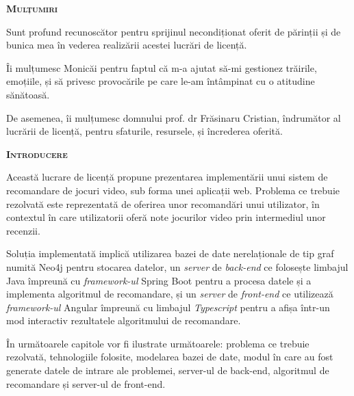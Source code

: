 \documentclass[12pt,a4paper]{report}
\begin{document}
\hfill \break
	\begin{center}
	{\scshape\large \textbf{Mulțumiri} \par}
	\end{center}
	
\begin{flushright}
\hfill \break
\hfill \break
Sunt profund recunoscător pentru sprijinul necondiționat oferit de părinții și de bunica mea în vederea realizării acestei lucrări de licență.
\end{flushright}
\hfill \break
\hfill \break
\hfill \break
\begin{flushright}
Îi mulțumesc Monicăi pentru faptul că m-a ajutat să-mi gestionez trăirile, emoțiile, și să privesc provocările pe care le-am întâmpinat cu o atitudine sănătoasă.
\end{flushright}
\hfill \break
\hfill \break
\hfill \break
\begin{flushright}
De asemenea, îi mulțumesc domnului prof. dr Frăsinaru Cristian, îndrumător al lucrării de licență, pentru sfaturile, resursele, și încrederea oferită.
\end{flushright}

\newpage
   
\renewcommand*{\contentsname}{Cuprins}
\tableofcontents
\newpage

\hfill \break

	\hfill \break
	\begin{center}
	{\scshape\large \textbf{Introducere} \par}
	\end{center}
	
	Această lucrare de licență propune prezentarea implementării unui sistem de recomandare de jocuri video, sub forma unei aplicații web. Problema ce trebuie rezolvată este reprezentată de oferirea unor recomandări unui utilizator, în contextul în care utilizatorii oferă note jocurilor video prin intermediul unor recenzii. 
	
	Soluția implementată implică utilizarea bazei de date nerelaționale de tip graf numită Neo4j pentru stocarea datelor, un \emph{server} de \emph{back-end} ce folosește limbajul Java împreună cu \emph{framework-ul} Spring Boot pentru a procesa datele și a implementa algoritmul de recomandare, și un \emph{server} de \emph{front-end} ce utilizează \emph{framework-ul} Angular împreună cu limbajul \emph{Typescript} pentru a afișa într-un mod interactiv rezultatele algoritmului de recomandare. 
	
	În următoarele capitole vor fi ilustrate următoarele: problema ce trebuie rezolvată, tehnologiile folosite, modelarea bazei de date, modul în care au fost generate datele de intrare ale problemei, server-ul de back-end, algoritmul de recomandare și server-ul de front-end.
	
\end{document}
